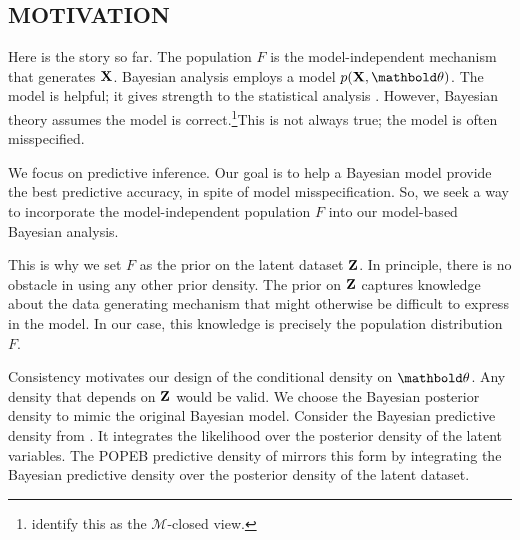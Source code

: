 \subsection{MOTIVATION}
\label{sub:remarks}

Here is the story so far. The population $F$ is the model-independent mechanism
that generates $\textbf{X}$. Bayesian analysis employs a model $p(\mbX,\mbtheta)$. The
model
is helpful; it gives strength to the statistical analysis \citep{young2005essentials}.
However, Bayesian theory assumes the model is
correct.\footnote{\citet{bernardo2000bayesian} identify this as the
$\mathcal{M}$-closed view.}\break This is not always true; the model is
often misspecified.\hspace*{-10pt}

We focus on predictive inference. Our goal is to help a Bayesian model provide
the best predictive accuracy, in spite of model misspecification.  So, we seek a
way to incorporate the model-independent population $F$ into our model-based
Bayesian analysis.

This is why we set $F$ as the prior on the latent dataset $\textbf{Z}$. In
principle, there is no obstacle in using any other prior density. The prior on
$\textbf{Z}$
captures knowledge about the data generating mechanism that might otherwise be
difficult to express in the model. In our case, this knowledge is precisely the
population distribution $F$.

Consistency motivates our design of the conditional density on $\mbtheta$.
Any density that depends on $\textbf{Z}$ would be valid. We choose
the Bayesian posterior density to mimic the original Bayesian model.
Consider the Bayesian predictive density from . It
integrates the likelihood over the posterior density of the latent variables.
The \gls{POPEB} predictive density of  mirrors this
form by integrating the Bayesian predictive density over the posterior density
of the latent dataset.
